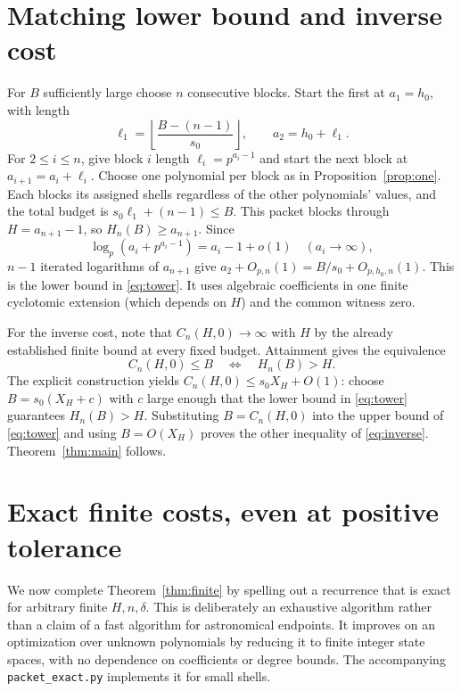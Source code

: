 \documentclass[11pt]{article}
\theoremstyle{remark}\newtheorem{remark}[theorem]{Remark}
\newcommand{\code}[1]{\texttt{#1}}
\begin{document}
\section{Matching lower bound and inverse cost}\label{sec:lower}
For $B$ sufficiently large choose $n$ consecutive blocks. Start the first at $a_1=h_0$, with length
\[
 \ell_1=\left\lfloor\frac{B-(n-1)}{s_0}\right\rfloor,\qquad a_2=h_0+\ell_1.
\]
For $2\le i\le n$, give block $i$ length $\ell_i=p^{a_i-1}$ and start the next block at $a_{i+1}=a_i+\ell_i$. Choose one polynomial per block as in Proposition~\ref{prop:one}. Each blocks its assigned shells regardless of the other polynomials' values, and the total budget is $s_0\ell_1+(n-1)\le B$. This packet blocks through $H=a_{n+1}-1$, so $H_n(B)\ge a_{n+1}$. Since
\[
 \log_p(a_i+p^{a_i-1})=a_i-1+o(1)\quad(a_i\to\infty),
\]
$n-1$ iterated logarithms of $a_{n+1}$ give $a_2+O_{p,n}(1)=B/s_0+O_{p,h_0,n}(1)$. This is the lower bound in \eqref{eq:tower}. It uses algebraic coefficients in one finite cyclotomic extension (which depends on $H$) and the common witness zero.

For the inverse cost, note that $C_n(H,0)\to\infty$ with $H$ by the already established finite bound at every fixed budget. Attainment gives the equivalence
\[
 C_n(H,0)\le B\quad\Longleftrightarrow\quad H_n(B)>H.
\]
The explicit construction yields $C_n(H,0)\le s_0 X_H+O(1)$: choose $B=s_0(X_H+c)$ with $c$ large enough that the lower bound in \eqref{eq:tower} guarantees $H_n(B)>H$. Substituting $B=C_n(H,0)$ into the upper bound of \eqref{eq:tower} and using $B=O(X_H)$ proves the other inequality of \eqref{eq:inverse}. Theorem~\ref{thm:main} follows.

\section{Exact finite costs, even at positive tolerance}\label{sec:algorithm}
We now complete Theorem~\ref{thm:finite} by spelling out a recurrence that is exact for arbitrary finite $H,n,\delta$. This is deliberately an exhaustive algorithm rather than a claim of a fast algorithm for astronomical endpoints. It improves on an optimization over unknown polynomials by reducing it to finite integer state spaces, with no dependence on coefficients or degree bounds. The accompanying \code{packet\_exact.py} implements it for small shells.
\end{document}
